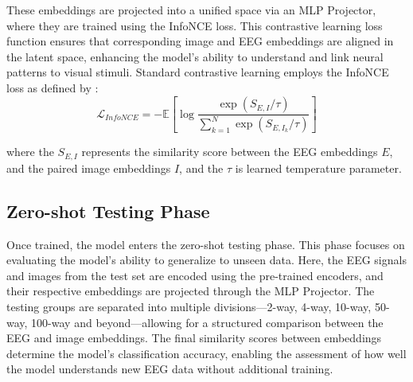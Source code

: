 \documentclass{article}
\begin{document}
These embeddings are projected into a unified space via an MLP Projector, where they are trained using the InfoNCE loss. This contrastive learning loss function ensures that corresponding image and EEG embeddings are aligned in the latent space, enhancing the model's ability to understand and link neural patterns to visual stimuli. Standard contrastive learning employs the InfoNCE loss as defined by \cite{oord2018representation, he2020momentum, radford2021learning}:
\begin{equation}
\mathcal{L}_{InfoNCE} = -\mathbb{E}\left[\log \frac{\exp(S_{E, I}/\tau)}{\sum_{k=1}^N \exp(S_{E, I_k}/\tau)}\right]
\end{equation}

where the \(S_{E, I}\) represents the similarity score between the EEG embeddings $E$, and the paired image embeddings $I$, and the \(\tau\) is learned temperature parameter.


\subsection{Zero-shot Testing Phase}
Once trained, the model enters the zero-shot testing phase. This phase focuses on evaluating the model’s ability to generalize to unseen data. Here, the EEG signals and images from the test set are encoded using the pre-trained encoders, and their respective embeddings are projected through the MLP Projector. The testing groups are separated into multiple divisions—2-way, 4-way, 10-way, 50-way, 100-way and beyond—allowing for a structured comparison between the EEG and image embeddings. The final similarity scores between embeddings determine the model's classification accuracy, enabling the assessment of how well the model understands new EEG data without additional training.
\end{document}
